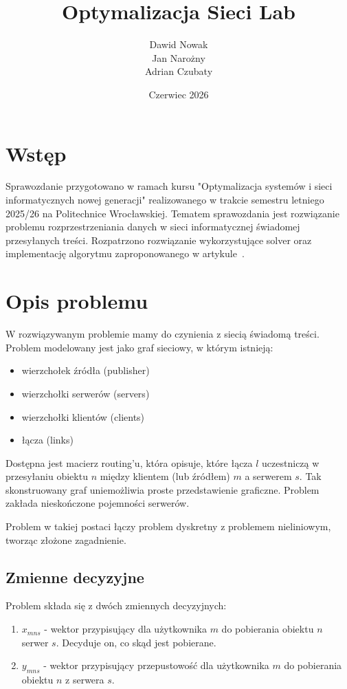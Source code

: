 \documentclass{article}
\title{Optymalizacja Sieci Lab}
\author{Dawid Nowak\\Jan Narożny\\Adrian Czubaty}
\date{Czerwiec 2026}
\begin{document}
\maketitle

\section{Wstęp}
Sprawozdanie przygotowano w ramach kursu "Optymalizacja systemów i sieci informatycznych nowej generacji" realizowanego w trakcie semestru letniego 2025/26 na Politechnice Wrocławskiej. Tematem sprawozdania jest rozwiązanie problemu rozprzestrzeniania danych w sieci informatycznej świadomej przesyłanych treści. Rozpatrzono rozwiązanie wykorzystujące solver oraz implementację algorytmu zaproponowanego w artykule~\cite{gasior2012}.

\section{Opis problemu}
W rozwiązywanym problemie mamy do czynienia z siecią świadomą treści. Problem modelowany jest jako graf sieciowy, w którym istnieją:
\begin{itemize}
    \item wierzchołek źródła (publisher)
    \item wierzchołki serwerów (servers)
    \item wierzchołki klientów (clients)
    \item łącza (links)
\end{itemize}

Dostępna jest macierz routing'u, która opisuje, które łącza $l$ uczestniczą w przesyłaniu obiektu $n$ między klientem (lub źródłem) $m$ a serwerem $s$. Tak skonstruowany graf uniemożliwia proste przedstawienie graficzne. Problem zakłada nieskończone pojemności serwerów.

Problem w takiej postaci łączy problem dyskretny z problemem nieliniowym, tworząc złożone zagadnienie.

\subsection{Zmienne decyzyjne}
Problem składa się z dwóch zmiennych decyzyjnych:
\begin{enumerate}
    \item $x_{mns}$ - wektor przypisujący dla użytkownika $m$ do pobierania obiektu $n$ serwer $s$. Decyduje on, co skąd jest pobierane.
    \item $y_{mns}$ - wektor przypisujący przepustowość dla użytkownika $m$ do pobierania obiektu $n$ z serwera $s$.
\end{enumerate}
\end{document}
